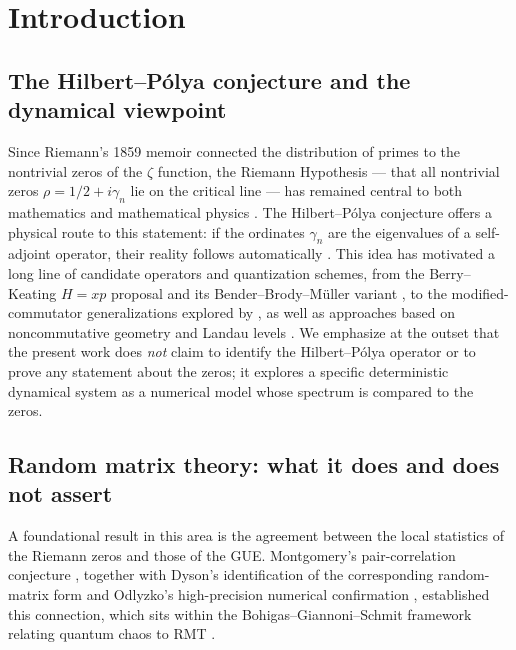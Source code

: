 \documentclass[utf8]{FrontiersinHarvard}
\begin{document}
\section{Introduction}

\subsection{The Hilbert--P\'olya conjecture and the dynamical viewpoint}

Since Riemann's 1859 memoir \citep{riemann1859} connected the distribution of primes to the nontrivial zeros of the $\zeta$ function, the Riemann Hypothesis --- that all nontrivial zeros $\rho = 1/2 + i\gamma_n$ lie on the critical line --- has remained central to both mathematics and mathematical physics \citep{titchmarsh1986,sarnak2000}. The Hilbert--P\'olya conjecture offers a physical route to this statement: if the ordinates $\gamma_n$ are the eigenvalues of a self-adjoint operator, their reality follows automatically \citep{schumayer2011}. This idea has motivated a long line of candidate operators and quantization schemes, from the Berry--Keating $H = xp$ proposal \citep{berry1999} and its Bender--Brody--M\"uller variant \citep{bender2017}, to the modified-commutator generalizations explored by \citet{bishop2019}, as well as approaches based on noncommutative geometry \citep{connes1999} and Landau levels \citep{sierra2008}. We emphasize at the outset that the present work does \emph{not} claim to identify the Hilbert--P\'olya operator or to prove any statement about the zeros; it explores a specific deterministic dynamical system as a numerical model whose spectrum is compared to the zeros.

\subsection{Random matrix theory: what it does and does not assert}

A foundational result in this area is the agreement between the local statistics of the Riemann zeros and those of the GUE. Montgomery's pair-correlation conjecture \citep{montgomery1973}, together with Dyson's identification of the corresponding random-matrix form \citep{dyson1962} and Odlyzko's high-precision numerical confirmation \citep{odlyzko1987}, established this connection, which sits within the Bohigas--Giannoni--Schmit framework relating quantum chaos to RMT \citep{bohigas1984,gutzwiller1990}.
\end{document}
